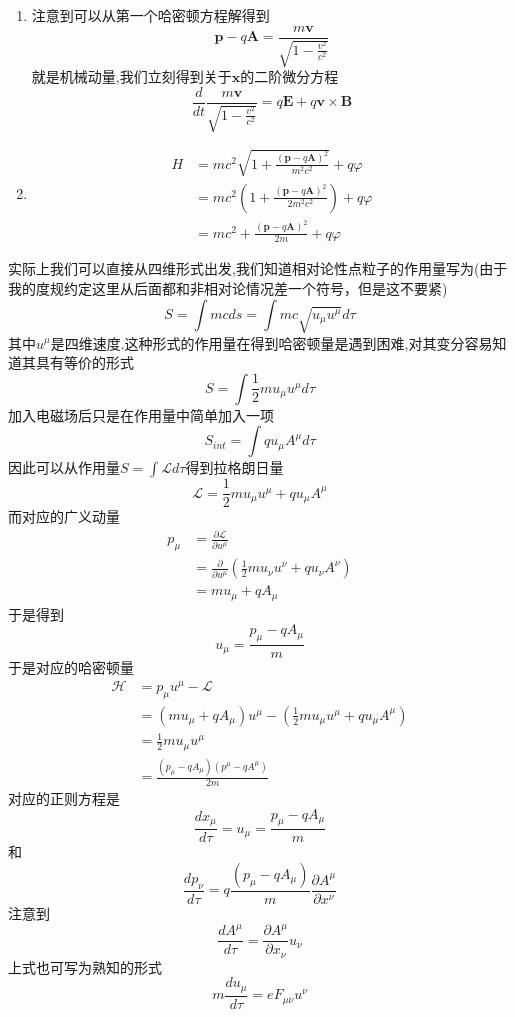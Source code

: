\begin{solution}
\begin{enumerate}[label=(\arabic*)]
    \item 注意到可以从第一个哈密顿方程解得到
    $$\textbf{p}-q\textbf{A}=\frac{m\textbf{v}}{\sqrt{1-\frac{v^2}{c^2}}}$$
    就是机械动量,我们立刻得到关于$\textbf{x}$的二阶微分方程
    $$\frac{d}{dt}\frac{m\textbf{v}}{\sqrt{1-\frac{v^2}{c^2}}}=q\textbf{E}+q\textbf{v}\times\textbf{B}$$
    \item 
    \begin{align*}
        H&=mc^2\sqrt{1+\frac{(\textbf{p}-q\textbf{A})^2}{m^2c^2}}+q\varphi\\
         &=mc^2(1+\frac{(\textbf{p}-q\textbf{A})^2}{2m^2c^2})+q\varphi\\
         &=mc^2+\frac{(\textbf{p}-q\textbf{A})^2}{2m}+q\varphi
    \end{align*}
    \end{enumerate}
    实际上我们可以直接从四维形式出发,我们知道相对论性点粒子的作用量写为(由于我的度规约定这里从后面都和非相对论情况差一个符号，但是这不要紧)
    $$S=\int mc ds=\int mc\sqrt{u_\mu u^\mu}d\tau$$
    其中$u^{\mu}$是四维速度.这种形式的作用量在得到哈密顿量是遇到困难,对其变分容易知道其具有等价的形式
    $$S=\int \frac12mu_\mu u^\mu d\tau$$
    加入电磁场后只是在作用量中简单加入一项
    $$S_{int}=\int qu_\mu A^\mu d\tau$$
    因此可以从作用量$S=\int \mathcal{L}d\tau$得到拉格朗日量
    $$\mathcal{L}=\frac12mu_\mu u^\mu+qu_\mu A^\mu$$
    而对应的广义动量
    \begin{align*}
        p_\mu&=\frac{\partial \mathcal{L}}{\partial u^\mu}\\
             &=\frac{\partial }{\partial u^{\mu}}(\frac12mu_\nu u^\nu+qu_\nu A^\nu)\\
             &=mu_\mu+qA_\mu
    \end{align*}
    于是得到
    $$u_\mu=\frac{p_\mu-qA_{\mu}}{m}$$
    于是对应的哈密顿量
    \begin{align*}
        \mathcal{H}&=p_\mu u^\mu-\mathcal{L}\\
                   &=(mu_\mu+qA_\mu)u^\mu-(\frac12mu_\mu u^\mu+qu_\mu A^\mu)\\
                   &=\frac12mu_\mu u^\mu\\
                   &=\frac{(p_\mu-qA_{\mu})(p^\mu-qA^{\mu})}{2m}
    \end{align*}
    对应的正则方程是
    $$\frac{dx_\mu}{d\tau}=u_\mu=\frac{p_\mu-qA_{\mu}}{m}$$
    和
    $$\frac{dp_\nu}{d\tau}=q\frac{(p_\mu-qA_{\mu})}{m}\frac{\partial A^\mu}{\partial x^\nu}$$
    注意到
    $$\frac{dA^{\mu}}{d\tau}=\frac{\partial A^\mu}{\partial x_{\nu}}u_\nu$$
    上式也可写为熟知的形式
    $$ m\frac{du_\mu}{d\tau}=eF_{\mu \nu}u^\nu$$
\end{solution}
